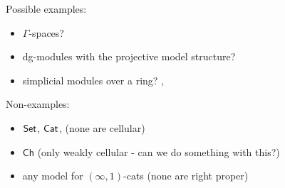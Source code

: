 \documentclass[a4paper,10pt
,draft
]{article}%
\renewcommand{\1}{\eta}%
\begin{document}
{\color{OliveGreen} %
  \begin{example}
        Possible examples:
        \begin{itemize}
        \item $\Gamma$-spaces?
        \item dg-modules with the projective model structure?
        \item simplicial modules over a ring? \cite[\S 3.1.15]{Rez96}, \cite[Example 4.23]{Cav}
        \end{itemize}
  \end{example}




  \begin{example}
        Non-examples:
        \begin{itemize}
        \item $\mathsf{Set}$, $\mathsf{Cat}$, (none are cellular)
        \item $\mathsf{Ch}$ (only weakly cellular - can we do something with this?)
        \item any model for $(\infty,1)$-cats (none are right proper)
        \end{itemize}
  \end{example}

}
\end{document}
